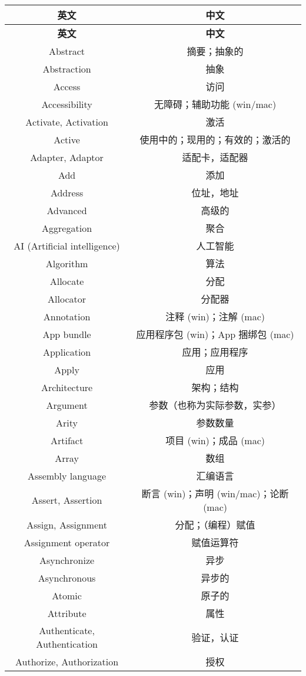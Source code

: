\documentclass[report, twoside, UTF8, AutoFakeBold = 1, AutoFakeSlant, zihao = -4]{config}
\begin{document}
\begin{center}
    \begin{longtable}{|c|c|}
        \hline
        \textbf{英文} & \textbf{中文} \\
        \hline
    \endfirsthead
        \hline
        \textbf{英文} & \textbf{中文} \\
        \hline
    \endhead
        \hline
    \endfoot 
    \endlastfoot
        Abstract & 摘要；抽象的 \\ 
        Abstraction & 抽象 \\ 
        Access & 访问 \\ 
        Accessibility & 无障碍；辅助功能 (win/mac) \\ 
        Activate, Activation & 激活 \\ 
        Active & 使用中的；现用的；有效的；激活的 \\ 
        Adapter, Adaptor & 适配卡，适配器 \\ 
        Add & 添加 \\ 
        Address & 位址，地址 \\ 
        Advanced & 高级的 \\ 
        Aggregation & 聚合 \\ 
        AI (Artificial intelligence) & 人工智能 \\ 
        Algorithm & 算法 \\ 
        Allocate & 分配 \\ 
        Allocator & 分配器 \\ 
        Annotation & 注释 (win)；注解 (mac) \\ 
        App bundle & 应用程序包 (win)；App 捆绑包 (mac) \\ 
        Application & 应用；应用程序 \\ 
        Apply & 应用 \\ 
        Architecture & 架构；结构 \\ 
        Argument & 参数（也称为实际参数，实参） \\ 
        Arity & 参数数量 \\ 
        Artifact & 项目 (win)；成品 (mac) \\ 
        Array & 数组 \\ 
        Assembly language & 汇编语言 \\ 
        Assert, Assertion & 断言 (win)；声明 (win/mac)；论断 (mac) \\ 
        Assign, Assignment & 分配；（编程）赋值 \\ 
        Assignment operator & 赋值运算符 \\ 
        Asynchronize & 异步 \\ 
        Asynchronous & 异步的 \\ 
        Atomic & 原子的 \\ 
        Attribute & 属性 \\ 
        Authenticate, Authentication & 验证，认证 \\ 
        Authorize, Authorization & 授权 \\ 
        \hline
    \end{longtable}
    
\end{center}
\end{document}
